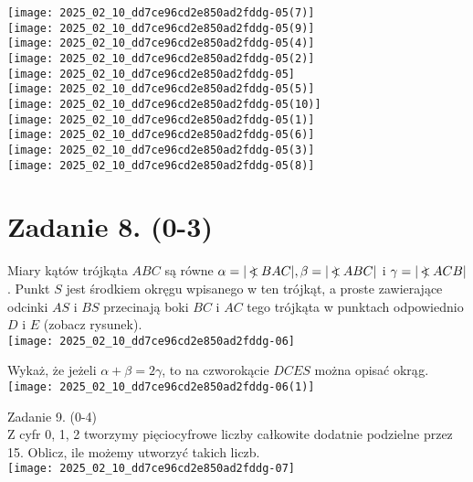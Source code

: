 \documentclass[10pt]{article}
\newcommand\Varangle{\mathop{{<\!\!\!\!\!\text{\small)}}\:}\nolimits}
\begin{document}
\texttt{[image: 2025\_02\_10\_dd7ce96cd2e850ad2fddg-05(7)]}\\
\texttt{[image: 2025\_02\_10\_dd7ce96cd2e850ad2fddg-05(9)]}\\
\texttt{[image: 2025\_02\_10\_dd7ce96cd2e850ad2fddg-05(4)]}\\
\texttt{[image: 2025\_02\_10\_dd7ce96cd2e850ad2fddg-05(2)]}\\
\(\qquad\)\\
\texttt{[image: 2025\_02\_10\_dd7ce96cd2e850ad2fddg-05]}\\
\texttt{[image: 2025\_02\_10\_dd7ce96cd2e850ad2fddg-05(5)]}\\
\texttt{[image: 2025\_02\_10\_dd7ce96cd2e850ad2fddg-05(10)]}\\
\texttt{[image: 2025\_02\_10\_dd7ce96cd2e850ad2fddg-05(1)]}\\
\texttt{[image: 2025\_02\_10\_dd7ce96cd2e850ad2fddg-05(6)]}\\
\texttt{[image: 2025\_02\_10\_dd7ce96cd2e850ad2fddg-05(3)]}\\
\texttt{[image: 2025\_02\_10\_dd7ce96cd2e850ad2fddg-05(8)]}

\section*{Zadanie 8. (0-3)}
Miary kątów trójkąta \(A B C\) są równe \(\alpha=|\Varangle B A C|, \beta=|\Varangle A B C|\) i \(\gamma=|\Varangle A C B|\). Punkt \(S\) jest środkiem okręgu wpisanego w ten trójkąt, a proste zawierające odcinki \(A S\) i \(B S\) przecinają boki \(B C\) i \(A C\) tego trójkąta w punktach odpowiednio \(D\) i \(E\) (zobacz rysunek).\\
\texttt{[image: 2025\_02\_10\_dd7ce96cd2e850ad2fddg-06]}

Wykaż, że jeżeli \(\alpha+\beta=2 \gamma\), to na czworokącie \(D C E S\) można opisać okrąg.\\
\texttt{[image: 2025\_02\_10\_dd7ce96cd2e850ad2fddg-06(1)]}

Zadanie 9. (0-4)\\
Z cyfr 0, 1, 2 tworzymy pięciocyfrowe liczby całkowite dodatnie podzielne przez 15. Oblicz, ile możemy utworzyć takich liczb.\\
\texttt{[image: 2025\_02\_10\_dd7ce96cd2e850ad2fddg-07]}
\end{document}
